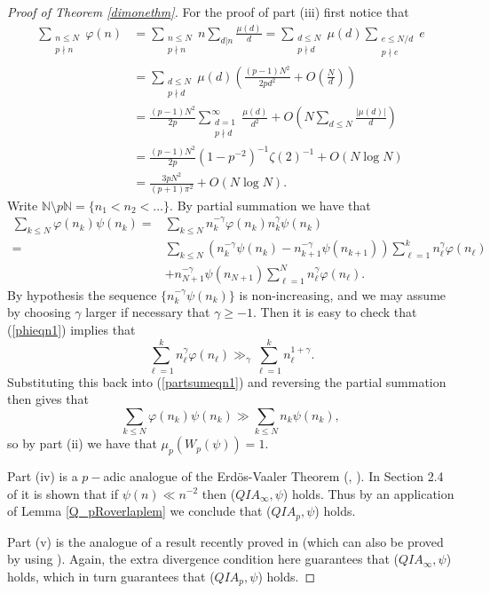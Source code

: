 \documentclass[12pt,reqno]{amsart}
\begin{document}
\begin{proof}[Proof of Theorem \ref{dimonethm}]
For the proof of part (iii) first notice that
\begin{align}
\sum_{\substack{n\le N\\p\nmid n}}\varphi (n)&=\sum_{\substack{n\le N\\p\nmid n}}n\sum_{d|n}\frac{\mu (d)}{d}=\sum_{\substack{d\le N\\p\nmid d}}\mu (d)\sum_{\substack{e\le N/d\\p\nmid e}}e\nonumber\\
&=\sum_{\substack{d\le N\\p\nmid d}}\mu (d)\left(\frac{(p-1)N^2}{2pd^2}+O\left(\frac{N}{d}\right)\right)\nonumber\\
&=\frac{(p-1)N^2}{2p}\sum_{\substack{d=1\\p\nmid d}}^\infty\frac{\mu (d)}{d^2}+O\left(N\sum_{d\le N}\frac{|\mu (d)|}{d}\right)\nonumber\\
&=\frac{(p-1)N^2}{2p}(1-p^{-2})^{-1}\zeta (2)^{-1}+O(N\log N)\nonumber\\
&=\frac{3pN^2}{(p+1)\pi^2}+O(N\log N).\label{phieqn1}
\end{align}
Write ${\mathbb{N}}\setminus p{\mathbb{N}}=\{n_1<n_2<\ldots\}$. By partial summation we have that
\begin{align}
\sum_{k\le N}\varphi (n_k)\psi (n_k)=&\sum_{k\le N}n_k^{-\gamma}\varphi (n_k)n_k^\gamma\psi (n_k)\nonumber\\
=&\sum_{k\le N}(n_k^{-\gamma}\psi (n_k)-n_{k+1}^{-\gamma}\psi (n_{k+1}))\sum_{\ell=1}^kn_\ell^\gamma\varphi (n_\ell)\label{partsumeqn1}\\
&+n_{N+1}^{-\gamma}\psi (n_{N+1})\sum_{\ell=1}^Nn_\ell^\gamma\varphi (n_\ell).\nonumber
\end{align}
By hypothesis the sequence $\{n_k^{-\gamma}\psi(n_k)\}$ is non-increasing, and we may assume by choosing $\gamma$ larger if necessary that $\gamma\ge -1$. Then it is easy to check that (\ref{phieqn1}) implies that
\[\sum_{\ell=1}^kn_\ell^\gamma\varphi (n_\ell)\gg_{\gamma}\sum_{\ell=1}^kn_\ell^{1+\gamma}.\]
Substituting this back into (\ref{partsumeqn1}) and reversing the partial summation then gives that
\[\sum_{k\le N}\varphi (n_k)\psi (n_k)\gg \sum_{k\le N}n_k\psi (n_k),\]
so by part (ii) we have that $\mu_p(W_p (\psi))=1$.

Part (iv) is a $p-$adic analogue of the Erd\"{o}s-Vaaler Theorem (\cite{Erdos}, \cite{Vaaler}). In Section 2.4 of \cite{HarmanMNT} it is shown that if $\psi (n)\ll n^{-2}$ then ($QIA_\infty , \psi$) holds. Thus by an application of Lemma \ref{Q_pRoverlaplem} we conclude that ($QIA_p, \psi$) holds.

Part (v) is the analogue of a result recently proved in \cite{HayPolVel} (which can also be proved by using \cite[Theorem 1 (iv)]{Harman1990}). Again, the extra divergence condition here guarantees that ($QIA_\infty , \psi$) holds, which in turn guarantees that ($QIA_p, \psi$) holds.
\end{proof}
\end{document}

